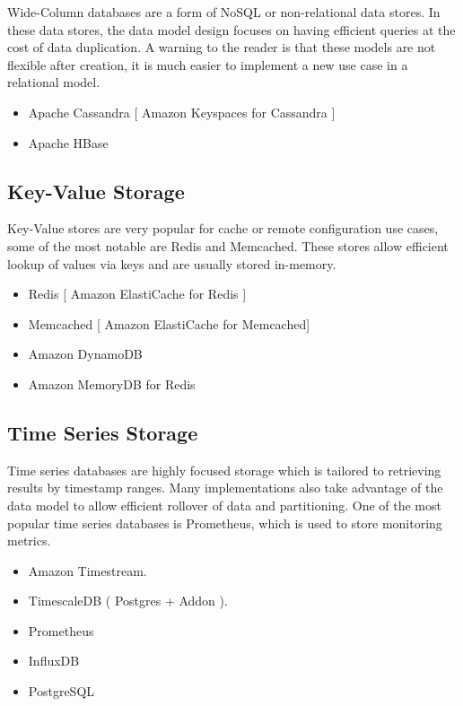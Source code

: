 \documentclass{csse4400}
\begin{document}
Wide-Column databases are a form of NoSQL or non-relational data stores.
In these data stores, the data model design focuses on having efficient queries at the cost of data duplication.
A warning to the reader is that these models are not flexible after creation,
it is much easier to implement a new use case in a relational model.

\begin{itemize}
  \item Apache Cassandra [ Amazon Keyspaces for Cassandra ]
  \item Apache HBase
\end{itemize}

\subsection{Key-Value Storage}

Key-Value stores are very popular for cache or remote configuration use cases,
some of the most notable are Redis and Memcached.
These stores allow efficient lookup of values via keys and are usually stored in-memory.

\begin{itemize}
  \item Redis [ Amazon ElastiCache for Redis ]
  \item Memcached [ Amazon ElastiCache for Memcached]
  \item Amazon DynamoDB
  \item Amazon MemoryDB for Redis
\end{itemize}

\subsection{Time Series Storage}


Time series databases are highly focused storage which is tailored to retrieving results by timestamp ranges.
Many implementations also take advantage of the data model to allow efficient rollover of data and partitioning.
One of the most popular time series databases is Prometheus, which is used to store monitoring metrics.

\begin{itemize}
  \item Amazon Timestream.
  \item TimescaleDB ( Postgres + Addon ).
  \item Prometheus
  \item InfluxDB
  \item PostgreSQL
\end{itemize}
\end{document}

